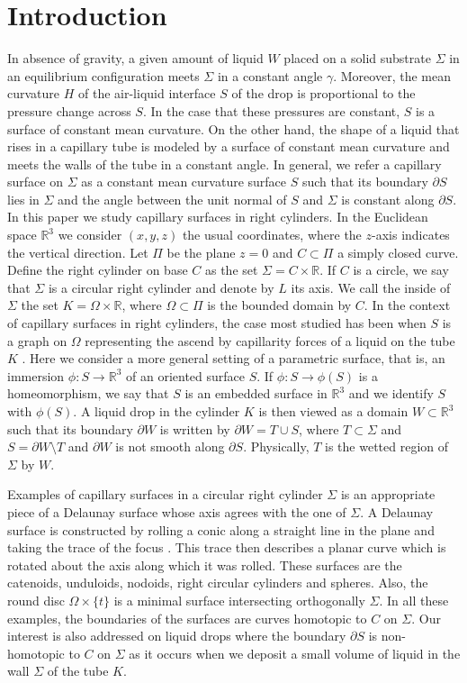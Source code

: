 \documentclass[12pt,a4paper]{amsart}
\begin{document}
\section{Introduction}
In absence of gravity, a given amount of liquid $W$ placed on a solid substrate $\Sigma$ in an equilibrium configuration meets $\Sigma$ in a constant angle $\gamma$. Moreover, the mean curvature $H$ of the air-liquid interface $S$ of the drop is proportional to the pressure change across $S$. In the case that these pressures are constant, $S$ is a surface of constant mean curvature. On the other hand, the shape of a liquid that rises in a capillary tube is modeled by a surface of constant mean curvature and meets the walls of the tube in a constant angle. In general, we refer a capillary surface on $\Sigma$ as a constant mean curvature surface $S$ such that its boundary $\partial S$ lies in $\Sigma$ and the angle between the unit normal of $S$ and $\Sigma$ is constant along $\partial S$.
In this paper we study capillary surfaces in right cylinders. In the Euclidean space ${\mathbb R}^3$ we consider $(x,y,z)$ the usual coordinates, where the $z$-axis indicates the vertical direction. Let $\Pi$ be the plane $z=0$ and $C\subset\Pi$ a simply closed curve. Define the right cylinder on base $C$ as the set $\Sigma=C\times{\mathbb R}$. If $C$ is a circle, we say that $\Sigma$ is a circular right cylinder and denote by $L$ its axis. We call the inside of $\Sigma$ the set $K=\Omega\times{\mathbb R}$, where
$\Omega\subset\Pi$ is the bounded domain by $C$. In the context of capillary surfaces in right cylinders, the case most studied has been when $S$ is a graph on $\Omega$ representing the ascend by capillarity forces of a liquid on the tube $K$ \cite{fi}. Here we consider a more general setting of a parametric surface, that is, an immersion $\phi:S\rightarrow {\mathbb R}^3$ of an oriented surface $S$. If $\phi:S\rightarrow\phi(S)$ is a homeomorphism, we say that $S$ is an embedded surface in ${\mathbb R}^3$ and we identify $S$ with $\phi(S)$. A liquid drop in the cylinder $K$ is then viewed as a domain $W\subset{\mathbb R}^3$ such that its boundary $\partial W$ is written by $\partial W=T\cup S$, where $T\subset \Sigma$ and $S=\partial W\setminus T$ and $\partial W$ is not smooth along $\partial S$. Physically, $T$ is the wetted region of $\Sigma$ by $W$.

Examples of capillary surfaces in a circular right cylinder $\Sigma$ is an appropriate piece of a Delaunay surface whose axis agrees with the one of $\Sigma$. A Delaunay surface is constructed by rolling a conic along a straight line in the plane and taking the trace of the focus \cite{de}. This trace then describes a planar curve which is rotated
about the axis along which it was rolled. These surfaces are the catenoids, unduloids, nodoids, right circular cylinders and spheres. Also, the round disc $\Omega\times\{t\}$ is a minimal surface intersecting orthogonally $\Sigma$. In all these examples, the boundaries of the surfaces are curves homotopic to $C$ on $\Sigma$. Our interest is also addressed on liquid drops where the boundary $\partial S$ is non-homotopic to $C$ on $\Sigma$ as it occurs when we deposit a small volume of liquid in the wall $\Sigma$ of the tube $K$.
\end{document}
